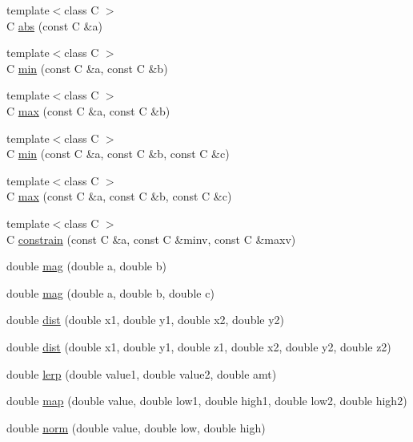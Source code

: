 \begin{DoxyCompactItemize}
{\footnotesize template$<$class C $>$ }\\\-C \hyperlink{namespacecprocessing_a240a51ca039c8fbd359e2fb8c2d583d9}{abs} (const \-C \&a)
\item 
{\footnotesize template$<$class C $>$ }\\\-C \hyperlink{namespacecprocessing_af95e692d22ac15bcca2320380e5835fe}{min} (const \-C \&a, const \-C \&b)
\item 
{\footnotesize template$<$class C $>$ }\\\-C \hyperlink{namespacecprocessing_ab4e75c25cbada0bb5a001658f44783e6}{max} (const \-C \&a, const \-C \&b)
\item 
{\footnotesize template$<$class C $>$ }\\\-C \hyperlink{namespacecprocessing_a8a241f2fab0a037ec7891f47c72a7b27}{min} (const \-C \&a, const \-C \&b, const \-C \&c)
\item 
{\footnotesize template$<$class C $>$ }\\\-C \hyperlink{namespacecprocessing_a6739cf85267bc8298c5fc87ad9a17c4e}{max} (const \-C \&a, const \-C \&b, const \-C \&c)
\item 
{\footnotesize template$<$class C $>$ }\\\-C \hyperlink{namespacecprocessing_a5f001d15dc5d3457f6d9b88c7eca54a9}{constrain} (const \-C \&a, const \-C \&minv, const \-C \&maxv)
\item 
double \hyperlink{namespacecprocessing_a2eebc33d41a8e243dd4f5bda43af75d5}{mag} (double a, double b)
\item 
double \hyperlink{namespacecprocessing_a2ac0d97a2d0825c780ccf9d178ea2904}{mag} (double a, double b, double c)
\item 
double \hyperlink{namespacecprocessing_aeae31092ccf4a4dc2553154be0945603}{dist} (double x1, double y1, double x2, double y2)
\item 
double \hyperlink{namespacecprocessing_a556b7ccc46527e951c0a0cf12f285fd1}{dist} (double x1, double y1, double z1, double x2, double y2, double z2)
\item 
double \hyperlink{namespacecprocessing_ad3e9bb8446fe8c867e5e90b33a451115}{lerp} (double value1, double value2, double amt)
\item 
double \hyperlink{namespacecprocessing_aff1e390b22ff2059099c0b9eadf05a51}{map} (double value, double low1, double high1, double low2, double high2)
\item 
double \hyperlink{namespacecprocessing_a9e4b103e9613fa8c7b6935fd68f59cdf}{norm} (double value, double low, double high)

\end{DoxyCompactItemize}
